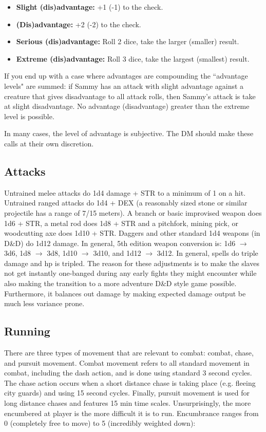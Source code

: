 \documentclass[letterpaper,12pt]{article}
\begin{document}
\begin{itemize}
\item \textbf{Slight (dis)advantage:} +1 (-1) to the check.
\item \textbf{(Dis)advantage:} +2 (-2) to the check. 
\item \textbf{Serious (dis)advantage:} Roll 2 dice, take the larger (smaller) result.
\item \textbf{Extreme (dis)advantage:} Roll 3 dice, take the largest (smallest) result.
\end{itemize}

If you end up with a case where advantages are compounding the ``advantage levels" are summed: if Sammy has an attack with slight advantage against a creature that gives disadvantage to all attack rolls, then Sammy's attack is take at slight disadvantage. No advantage (disadvantage) greater than the extreme level is possible.   

In many cases, the level of advantage is subjective. The DM should make these calls at their own discretion.

\subsection{Attacks}

 Untrained melee attacks do 1d4 damage + STR to a minimum of 1 on a hit. Untrained ranged attacks do 1d4 + DEX (a reasonably sized stone or similar projectile has a range of 7/15 meters). A branch or basic improvised weapon does 1d6 + STR, a metal rod does 1d8 + STR and a pitchfork, mining pick, or woodcutting axe does 1d10 + STR. Daggers and other standard 1d4 weapons (in D\&D) do 1d12 damage. In general, 5th edition weapon conversion is: 1d6 $\rightarrow$ 3d6, 1d8 $\rightarrow$ 3d8, 1d10 $\rightarrow$ 3d10, and 1d12 $\rightarrow$ 3d12. In general, spells do triple damage and hp is tripled. The reason for these adjustments is to make the slaves not get instantly one-banged during any early fights they might encounter while also making the transition to a more adventure D\&D style game possible. Furthermore, it balances out damage by making expected damage output be much less variance prone. 

\subsection{Running}

 There are three types of movement that are relevant to combat: combat, chase, and pursuit movement. Combat movement refers to all standard movement in combat, including the dash action, and is done using standard 3 second cycles. The chase action occurs when a short distance chase is taking place (e.g. fleeing city guards) and using 15 second cycles. Finally, pursuit movement is used for long distance chases and features 15 min time scales. Unsurprisingly, the more encumbered at player is the more difficult it is to run. Encumbrance ranges from 0 (completely free to move) to 5 (incredibly weighted down):
 
\end{document}
